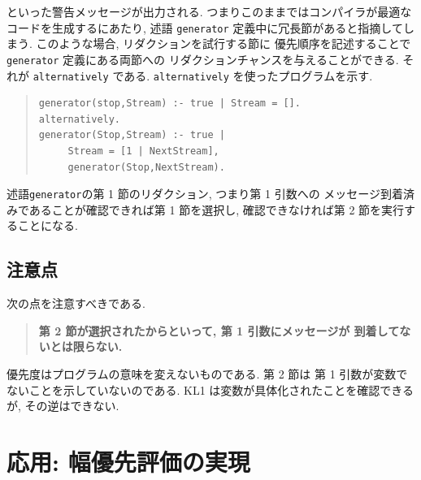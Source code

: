 \documentclass[a4,titlepage]{jsreport}
\let\dg\bf
\newenvironment{program}{\begin{quote}}{\end{quote}}
\begin{document}
といった警告メッセージが出力される.  
つまりこのままではコンパイラが最適なコードを生成するにあたり, 
述語 {\tt generator} 定義中に冗長節があると指摘してしまう.  
このような場合, リダクションを試行する節に
優先順序を記述することで {\tt generator} 定義にある両節への
リダクションチャンスを与えることができる.  それが {\tt alternatively} である.  
{\tt alternatively} を使ったプログラムを示す.  
\begin{program}
\begin{Verbatim}[baselinestretch=0.8]
generator(stop,Stream) :- true | Stream = [].
alternatively.
generator(Stop,Stream) :- true |
     Stream = [1 | NextStream],
     generator(Stop,NextStream).
\end{Verbatim}
\end{program}
述語{\tt generator}の第 1 節のリダクション, つまり第 1 引数への
メッセージ到着済みであることが確認できれば第 1 節を選択し, 
確認できなければ第 2 節を実行することになる.  
\subsection*{注意点}
次の点を注意すべきである.  
\begin{quote}
{\dg 第 2 節が選択されたからといって, 第 1 引数にメッセージが
到着してないとは限らない.}
\end{quote}
優先度はプログラムの意味を変えないものである.  第 2 節は
第 1 引数が変数でないことを示していないのである.  
KL1 は変数が具体化されたことを確認できるが, 
その逆はできない.  

\section{応用: 幅優先評価の実現}
\end{document}
